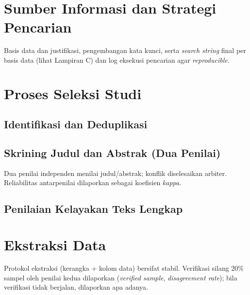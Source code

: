 \documentclass[12pt,a4paper,oneside]{report}
\begin{document}
\section{Sumber Informasi dan Strategi Pencarian}
Basis data dan justifikasi, pengembangan kata kunci, serta \textit{search string}
final per basis data (lihat Lampiran C) dan log eksekusi pencarian agar
\emph{reproducible}.

\section{Proses Seleksi Studi}
\subsection{Identifikasi dan Deduplikasi}
\subsection{Skrining Judul dan Abstrak (Dua Penilai)}
Dua penilai independen menilai judul/abstrak; konflik diselesaikan arbiter.
Reliabilitas antarpenilai dilaporkan sebagai koefisien \textit{kappa}.
\subsection{Penilaian Kelayakan Teks Lengkap}

\section{Ekstraksi Data}
Protokol ekstraksi (kerangka + kolom data) bersifat stabil. Verifikasi silang
20\% sampel oleh penilai kedua dilaporkan (\textit{verified sample},
\textit{disagreement rate}); bila verifikasi tidak berjalan, dilaporkan apa adanya.
\end{document}
